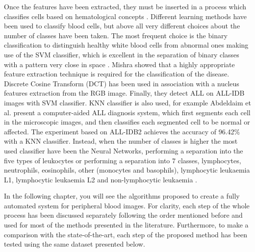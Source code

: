 Once the features have been extracted, they must be inserted in a process which classifies cells based on hematological concepts \cite{Biondi, Serbouti}. 
Different learning methods have been used to classify blood cells, but above all very different choices about the number of classes have been taken. The most frequent choice is the binary classification to distinguish healthy white blood cells from abnormal ones making use of the SVM classifier, which is excellent in the separation of binary classes with a pattern very close in space \cite{Mohapatra10a, Mohapatra10b, Mohapatra10c, Mohapatra14}. Mishra \cite{Mishra2017} showed that a highly appropriate feature extraction technique is required for the classification of the disease. Discrete Cosine Transform (DCT) has been used in association with a nucleus features extraction from the RGB image. Finally, they detect ALL on ALL-IDB images with SVM classifier.
KNN classifier is also used, for example Abdeldaim et al. \cite{Abdeldaim2018} present a computer-aided ALL diagnosis system, which first segments each cell in the microscopic images, and then classifies each segmented cell to be normal or affected. The experiment based on ALL-IDB2 achieves the
accuracy of 96.42\% with a KNN classifier. Instead, when the number of classes is higher the most used classifier have been the Neural Networks, performing a separation into the five types of leukocytes \cite{Sco06} or performing a separation into 7 classes, lymphocytes, neutrophils, eosinophils, other (monocytes and basophils), lymphocytic leukaemia L1, lymphocytic leukaemia L2 and non-lymphocytic leukaemia \cite{Buavirat}. 

In the following chapter, you will see the algorithms proposed to create a fully automated system for peripheral blood images. For clarity, each step of the whole process has been discussed separately following the order mentioned before and used for most of the methods presented in the literature. Furthermore, to make a comparison with the state-of-the-art, each step of the proposed method has been tested using the same dataset presented below.

